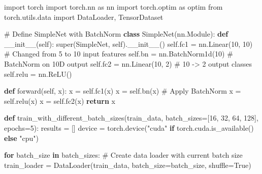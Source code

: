 \documentclass[
  letterpaper,
  DIV=11,
  numbers=noendperiod]{scrreprt}
\newenvironment{Shaded}{\begin{snugshade}}{\end{snugshade}}
\newcommand{\BuiltInTok}[1]{\textcolor[rgb]{0.00,0.23,0.31}{#1}}
\newcommand{\CommentTok}[1]{\textcolor[rgb]{0.37,0.37,0.37}{#1}}
\newcommand{\ControlFlowTok}[1]{\textcolor[rgb]{0.00,0.23,0.31}{\textbf{#1}}}
\newcommand{\DecValTok}[1]{\textcolor[rgb]{0.68,0.00,0.00}{#1}}
\newcommand{\FunctionTok}[1]{\textcolor[rgb]{0.28,0.35,0.67}{#1}}
\newcommand{\ImportTok}[1]{\textcolor[rgb]{0.00,0.46,0.62}{#1}}
\newcommand{\KeywordTok}[1]{\textcolor[rgb]{0.00,0.23,0.31}{\textbf{#1}}}
\newcommand{\NormalTok}[1]{\textcolor[rgb]{0.00,0.23,0.31}{#1}}
\newcommand{\OperatorTok}[1]{\textcolor[rgb]{0.37,0.37,0.37}{#1}}
\newcommand{\StringTok}[1]{\textcolor[rgb]{0.13,0.47,0.30}{#1}}
\newcommand{\VariableTok}[1]{\textcolor[rgb]{0.07,0.07,0.07}{#1}}
\begin{document}
\begin{Shaded}
\begin{Highlighting}[]
\ImportTok{import}\NormalTok{ torch}
\ImportTok{import}\NormalTok{ torch.nn }\ImportTok{as}\NormalTok{ nn}
\ImportTok{import}\NormalTok{ torch.optim }\ImportTok{as}\NormalTok{ optim}
\ImportTok{from}\NormalTok{ torch.utils.data }\ImportTok{import}\NormalTok{ DataLoader, TensorDataset}

\CommentTok{\# Define SimpleNet with BatchNorm}
\KeywordTok{class}\NormalTok{ SimpleNet(nn.Module):}
    \KeywordTok{def} \FunctionTok{\_\_init\_\_}\NormalTok{(}\VariableTok{self}\NormalTok{):}
        \BuiltInTok{super}\NormalTok{(SimpleNet, }\VariableTok{self}\NormalTok{).}\FunctionTok{\_\_init\_\_}\NormalTok{()}
        \VariableTok{self}\NormalTok{.fc1 }\OperatorTok{=}\NormalTok{ nn.Linear(}\DecValTok{10}\NormalTok{, }\DecValTok{10}\NormalTok{)  }\CommentTok{\# Changed from 5 to 10 input features}
        \VariableTok{self}\NormalTok{.bn }\OperatorTok{=}\NormalTok{ nn.BatchNorm1d(}\DecValTok{10}\NormalTok{)  }\CommentTok{\# BatchNorm on 10D output}
        \VariableTok{self}\NormalTok{.fc2 }\OperatorTok{=}\NormalTok{ nn.Linear(}\DecValTok{10}\NormalTok{, }\DecValTok{2}\NormalTok{)  }\CommentTok{\# 10 {-}\textgreater{} 2 output classes}
        \VariableTok{self}\NormalTok{.relu }\OperatorTok{=}\NormalTok{ nn.ReLU()}

    \KeywordTok{def}\NormalTok{ forward(}\VariableTok{self}\NormalTok{, x):}
\NormalTok{        x }\OperatorTok{=} \VariableTok{self}\NormalTok{.fc1(x)}
\NormalTok{        x }\OperatorTok{=} \VariableTok{self}\NormalTok{.bn(x)  }\CommentTok{\# Apply BatchNorm}
\NormalTok{        x }\OperatorTok{=} \VariableTok{self}\NormalTok{.relu(x)}
\NormalTok{        x }\OperatorTok{=} \VariableTok{self}\NormalTok{.fc2(x)}
        \ControlFlowTok{return}\NormalTok{ x}

\KeywordTok{def}\NormalTok{ train\_with\_different\_batch\_sizes(train\_data, batch\_sizes}\OperatorTok{=}\NormalTok{[}\DecValTok{16}\NormalTok{, }\DecValTok{32}\NormalTok{, }\DecValTok{64}\NormalTok{, }\DecValTok{128}\NormalTok{], epochs}\OperatorTok{=}\DecValTok{5}\NormalTok{):}
\NormalTok{    results }\OperatorTok{=}\NormalTok{ []}
\NormalTok{    device }\OperatorTok{=}\NormalTok{ torch.device(}\StringTok{"cuda"} \ControlFlowTok{if}\NormalTok{ torch.cuda.is\_available() }\ControlFlowTok{else} \StringTok{"cpu"}\NormalTok{)  }

    \ControlFlowTok{for}\NormalTok{ batch\_size }\KeywordTok{in}\NormalTok{ batch\_sizes:}
        \CommentTok{\# Create data loader with current batch size}
\NormalTok{        train\_loader }\OperatorTok{=}\NormalTok{ DataLoader(train\_data, batch\_size}\OperatorTok{=}\NormalTok{batch\_size, shuffle}\OperatorTok{=}\VariableTok{True}\NormalTok{)}


\end{Highlighting}
\end{Shaded}
\end{document}

